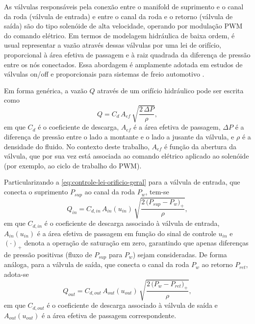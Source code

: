 As válvulas responsáveis pela conexão entre o manifold de suprimento e o canal da roda (válvula de entrada) e entre o canal da roda e o retorno (válvula de saída) são do tipo solenóide de alta velocidade, operando por modulação PWM do comando elétrico. Em termos de modelagem hidráulica de baixa ordem, é usual representar a vazão através dessas válvulas por uma lei de orifício, proporcional à área efetiva de passagem e à raiz quadrada da diferença de pressão entre os nós conectados. Essa abordagem é amplamente adotada em estudos de válvulas on/off e proporcionais para sistemas de freio automotivo \cite{ProportionalPressureABS2023,Lv2014,ChenLv2017,PressureCoordinatedControl2023}.

Em forma genérica, a vazão $Q$ através de um orifício hidráulico pode ser escrita como
\begin{equation}
    Q = C_d\,A_{ef}\,\sqrt{\frac{2\,\Delta P}{\rho}},
    \label{eq:controle-lei-orificio-geral}
\end{equation}
em que $C_d$ é o coeficiente de descarga, $A_{ef}$ é a área efetiva de passagem, $\Delta P$ é a diferença de pressão entre o lado a montante e o lado a jusante da válvula, e $\rho$ é a densidade do fluido. No contexto deste trabalho, $A_{ef}$ é função da abertura da válvula, que por sua vez está associada ao comando elétrico aplicado ao solenóide (por exemplo, ao ciclo de trabalho do PWM).

Particularizando a \eqref{eq:controle-lei-orificio-geral} para a válvula de entrada, que conecta o suprimento $P_{sup}$ ao canal da roda $P_w$, tem-se
\begin{equation}
    Q_{in} = C_{d,in}\,A_{in}(u_{in})\,\sqrt{\frac{2\,\big(P_{sup} - P_w\big)_{+}}{\rho}},
    \label{eq:controle-Qin}
\end{equation}
em que $C_{d,in}$ é o coeficiente de descarga associado à válvula de entrada, $A_{in}(u_{in})$ é a área efetiva de passagem em função do sinal de controle $u_{in}$ e $(\cdot)_{+}$ denota a operação de saturação em zero, garantindo que apenas diferenças de pressão positivas (fluxo de $P_{sup}$ para $P_w$) sejam consideradas. De forma análoga, para a válvula de saída, que conecta o canal da roda $P_w$ ao retorno $P_{ret}$, adota-se
\begin{equation}
    Q_{out} = C_{d,out}\,A_{out}(u_{out})\,\sqrt{\frac{2\,\big(P_{w} - P_{ret}\big)_{+}}{\rho}},
    \label{eq:controle-Qout}
\end{equation}
em que $C_{d,out}$ é o coeficiente de descarga associado à válvula de saída e $A_{out}(u_{out})$ é a área efetiva de passagem correspondente.

